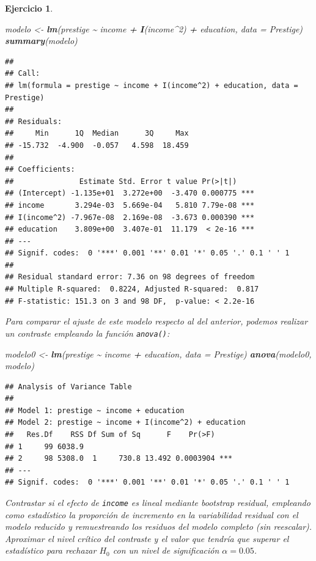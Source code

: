 \documentclass[
]{book}
\newenvironment{Shaded}{\begin{snugshade}}{\end{snugshade}}
\newcommand{\AttributeTok}[1]{\textcolor[rgb]{0.13,0.29,0.53}{#1}}
\newcommand{\DecValTok}[1]{\textcolor[rgb]{0.00,0.00,0.81}{#1}}
\newcommand{\FunctionTok}[1]{\textcolor[rgb]{0.13,0.29,0.53}{\textbf{#1}}}
\newcommand{\NormalTok}[1]{#1}
\newcommand{\OtherTok}[1]{\textcolor[rgb]{0.56,0.35,0.01}{#1}}
\newcommand{\SpecialCharTok}[1]{\textcolor[rgb]{0.81,0.36,0.00}{\textbf{#1}}}
\theoremstyle{break}
\newtheorem{exercise}{Ejercicio}[chapter]
\theoremstyle{nonumberplain}
\begin{document}
\begin{exercise}
\begin{Shaded}
\begin{Highlighting}[]
\NormalTok{modelo }\OtherTok{\textless{}{-}} \FunctionTok{lm}\NormalTok{(prestige }\SpecialCharTok{\textasciitilde{}}\NormalTok{ income }\SpecialCharTok{+} \FunctionTok{I}\NormalTok{(income}\SpecialCharTok{\^{}}\DecValTok{2}\NormalTok{) }\SpecialCharTok{+}\NormalTok{ education, }\AttributeTok{data =}\NormalTok{ Prestige)}
\FunctionTok{summary}\NormalTok{(modelo)}
\end{Highlighting}
\end{Shaded}

\begin{verbatim}
## 
## Call:
## lm(formula = prestige ~ income + I(income^2) + education, data = Prestige)
## 
## Residuals:
##     Min      1Q  Median      3Q     Max 
## -15.732  -4.900  -0.057   4.598  18.459 
## 
## Coefficients:
##               Estimate Std. Error t value Pr(>|t|)    
## (Intercept) -1.135e+01  3.272e+00  -3.470 0.000775 ***
## income       3.294e-03  5.669e-04   5.810 7.79e-08 ***
## I(income^2) -7.967e-08  2.169e-08  -3.673 0.000390 ***
## education    3.809e+00  3.407e-01  11.179  < 2e-16 ***
## ---
## Signif. codes:  0 '***' 0.001 '**' 0.01 '*' 0.05 '.' 0.1 ' ' 1
## 
## Residual standard error: 7.36 on 98 degrees of freedom
## Multiple R-squared:  0.8224, Adjusted R-squared:  0.817 
## F-statistic: 151.3 on 3 and 98 DF,  p-value: < 2.2e-16
\end{verbatim}

Para comparar el ajuste de este modelo respecto al del anterior, podemos
realizar un contraste empleando la función \texttt{anova()}:

\begin{Shaded}
\begin{Highlighting}[]
\NormalTok{modelo0 }\OtherTok{\textless{}{-}} \FunctionTok{lm}\NormalTok{(prestige }\SpecialCharTok{\textasciitilde{}}\NormalTok{ income }\SpecialCharTok{+}\NormalTok{ education, }\AttributeTok{data =}\NormalTok{ Prestige)}
\FunctionTok{anova}\NormalTok{(modelo0, modelo)}
\end{Highlighting}
\end{Shaded}

\begin{verbatim}
## Analysis of Variance Table
## 
## Model 1: prestige ~ income + education
## Model 2: prestige ~ income + I(income^2) + education
##   Res.Df    RSS Df Sum of Sq      F    Pr(>F)    
## 1     99 6038.9                                  
## 2     98 5308.0  1     730.8 13.492 0.0003904 ***
## ---
## Signif. codes:  0 '***' 0.001 '**' 0.01 '*' 0.05 '.' 0.1 ' ' 1
\end{verbatim}

Contrastar si el efecto de \texttt{income} es lineal mediante bootstrap residual,
empleando como estadístico la proporción de incremento en la variabilidad residual con el
modelo reducido y remuestreando los residuos del modelo completo (sin reescalar).
Aproximar el nivel crítico del contraste y el valor que tendría que superar el
estadístico para rechazar \(H_0\) con un nivel de significación \(\alpha = 0.05\).
\end{exercise}
\end{document}
